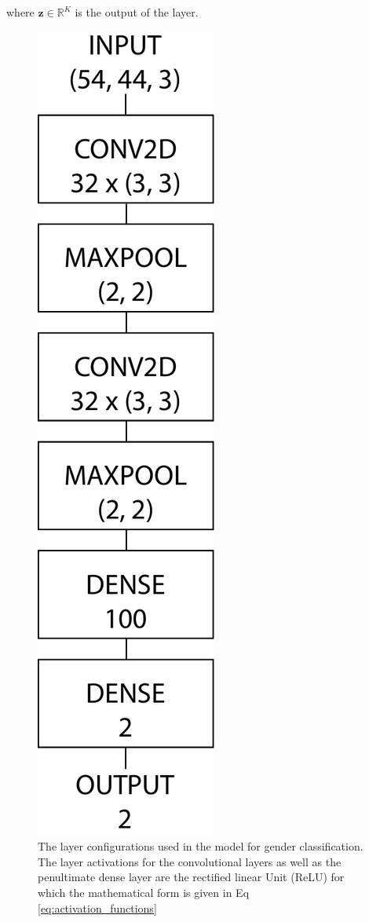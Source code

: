 \documentclass{article}
\begin{document}
	    where $\boldsymbol{z} \in \mathbb{R}^K$ is the output of the layer.
	    \\
	    
	    \begin{figure}[htb]
	    	\centering
	    	\includegraphics[scale=0.5]{a1_cnn.pdf}
	    	\caption{The layer configurations used in the model for gender classification. The layer activations for the convolutional layers as well as the penultimate dense layer are the rectified linear Unit (ReLU) for which the mathematical form is given in Eq \ref{eq:activation_functions}}
	    	\label{fig:a1_cnn}	
	    \end{figure}
	
\end{document}
